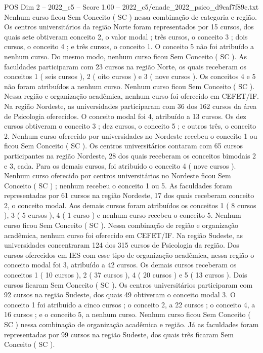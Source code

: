 \begin{textsample}{POS Dim 2 – 2022\_c5 – Score 1.00 – 2022\_c5/enade\_2022\_psico\_d9caf7f89c.txt}
Nenhum curso ficou Sem Conceito ( SC ) nessa combinação de categoria e região.
Os centros universitários da região Norte foram representados por 15 cursos, dos quais sete obtiveram conceito 2, o valor modal ; três cursos, o conceito 3 ; dois cursos, o conceito 4 ; e três cursos, o conceito 1.
O conceito 5 não foi atribuído a nenhum curso.
Do mesmo modo, nenhum curso ficou Sem Conceito ( SC ).
As faculdades participaram com 23 cursos na região Norte, os quais receberam os conceitos 1 ( seis cursos ), 2 ( oito cursos ) e 3 ( nove cursos ).
Os conceitos 4 e 5 não foram atribuídos a nenhum curso.
Nenhum curso ficou Sem Conceito ( SC ).
Nessa região e organização acadêmica, nenhum curso foi oferecido em CEFET/IF.
Na região Nordeste, as universidades participaram com 36 dos 162 cursos da área de Psicologia oferecidos.
O conceito modal foi 4, atribuído a 13 cursos.
Os dez cursos obtiveram o conceito 3 ; dez cursos, o conceito 5 ; e outros três, o conceito 2.
Nenhum curso oferecido por universidades no Nordeste recebeu o conceito 1 ou ficou Sem Conceito ( SC ).
Os centros universitários contaram com 65 cursos participantes na região Nordeste, 28 dos quais receberam os conceitos bimodais 2 e 3, cada.
Para os demais cursos, foi atribuído o conceito 4 ( nove cursos ).
Nenhum curso oferecido por centros universitários no Nordeste ficou Sem Conceito ( SC ) ; nenhum recebeu o conceito 1 ou 5.
As faculdades foram representadas por 61 cursos na região Nordeste, 17 dos quais receberam conceito 2, o conceito modal.
Aos demais cursos foram atribuídos os conceitos 1 ( 8 cursos ), 3 ( 5 cursos ), 4 ( 1 curso ) e nenhum curso recebeu o conceito 5.
Nenhum curso ficou Sem Conceito ( SC ).
Nessa combinação de região e organização acadêmica, nenhum curso foi oferecido em CEFET/IF.
Na região Sudeste, as universidades concentraram 124 dos 315 cursos de Psicologia da região.
Dos cursos oferecidos em IES com esse tipo de organização acadêmica, nessa região o conceito modal foi 3, atribuído a 42 cursos.
Os demais cursos receberam os conceitos 1 ( 10 cursos ), 2 ( 37 cursos ), 4 ( 20 cursos ) e 5 ( 13 cursos ).
Dois cursos ficaram Sem Conceito ( SC ).
Os centros universitários participaram com 92 cursos na região Sudeste, dos quais 49 obtiveram o conceito modal 3.
O conceito 1 foi atribuído a cinco cursos ; o conceito 2, a 22 cursos ; o conceito 4, a 16 cursos ; e o conceito 5, a nenhum curso.
Nenhum curso ficou Sem Conceito ( SC ) nessa combinação de organização acadêmica e região.
Já as faculdades foram representadas por 99 cursos na região Sudeste, dos quais três ficaram Sem Conceito ( SC ).

\end{textsample}

